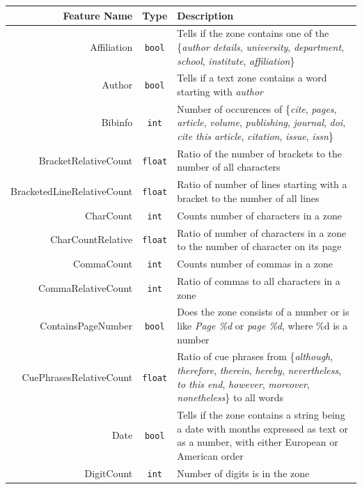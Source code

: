 \begin{appendix}
\small
\setlength\LTleft{-2cm}
\begin{longtable}[c]{|r|c|p{8cm}|}
\hline
\textbf{Feature Name} & \textbf{Type} & \textbf{Description} \\ \hline
Affiliation & \verb+bool+ & Tells if the zone contains one of the \{\textit{author details}, \textit{university}, \textit{department}, \textit{school}, \textit{institute}, \textit{affiliation}\}\\ \hline
Author & \verb+bool+ & Tells if a text zone contains a word starting with \textit{author}\\ \hline
Bibinfo & \verb+int+ & Number of occurences of \{\textit{cite}, \textit{pages}, \textit{article}, \textit{volume}, \textit{publishing}, \textit{journal}, \textit{doi}, \textit{cite this article}, \textit{citation}, \textit{issue}, \textit{issn}\} \\ \hline
BracketRelativeCount & \verb+float+ & Ratio of the number of brackets to the number of all characters \\ \hline
BracketedLineRelativeCount & \verb+float+ & Ratio of number of lines starting with a bracket to the number of all lines\\ \hline
CharCount & \verb+int+ & Counts number of characters in a zone\\ \hline
CharCountRelative & \verb+float+ & Ratio of number of characters in a zone to the number of character on its page\\ \hline
CommaCount & \verb+int+ & Counts number of commas in a zone\\ \hline
CommaRelativeCount & \verb+int+ & Ratio of commas to all characters in a zone \\ \hline
ContainsPageNumber & \verb+bool+  & Does the zone consists of a number or is like \textit{Page \%d} or \textit{page \%d}, where \%d is a number \\ \hline
CuePhrasesRelativeCount & \verb+float+ & Ratio of cue phrases from \{\textit{although}, \textit{therefore}, \textit{therein}, \textit{hereby}, \textit{nevertheless}, \textit{to this end}, \textit{however}, \textit{moreover}, \textit{nonetheless}\} to all words\\ \hline
Date & \verb+bool+ & Tells if the zone contains a string being a date with months expressed as text or as a number, with either European or American order\\ \hline
DigitCount & \verb+int+ & Number of digits is in the zone\\ \hline

\end{longtable}
\end{appendix}
